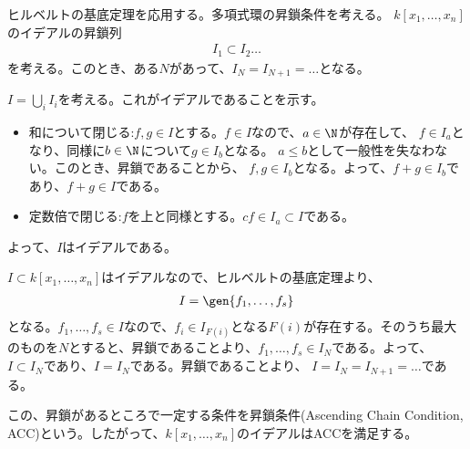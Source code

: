 ヒルベルトの基底定理を応用する。多項式環の昇鎖条件を考える。
$k[x_1,\dots,x_n]$のイデアルの昇鎖列
\begin{align}
  I_1 \subset I_2 \dots
\end{align}
を考える。このとき、ある$N$があって、$I_N = I_{N+1}=\dots$となる。
\begin{myproof}
  $I=\bigcup_{i} I_i$を考える。これがイデアルであることを示す。
  \begin{itemize}
    \item 和について閉じる:$f,g\in I$とする。$f\in I$なので、$a\in \N$が存在して、
    $f \in I_a$となり、同様に$b\in \N$について$g\in I_b$となる。
    $a\le b$として一般性を失なわない。このとき、昇鎖であることから、
    $f,g\in I_b$となる。よって、$f+g \in I_b$であり、$f+g \in I$である。
    \item 定数倍で閉じる:$f$を上と同様とする。$cf \in I_a \subset I$である。
  \end{itemize}
  よって、$I$はイデアルである。

  $I\subset k[x_1,\dots,x_n]$はイデアルなので、ヒルベルトの基底定理より、
  \begin{align}
    I = \gen{f_1,\dots,f_s}
  \end{align}
  となる。$f_1,\dots,f_s \in I$なので、$f_i \in I_{F(i)}$となる$F(i)$が存在する。そのうち最大のものを$N$とすると、昇鎖であることより、$f_1,\dots,f_s \in I_{N}$である。よって、$I\subset I_N$であり、$I = I_N$である。昇鎖であることより、
  $I=I_N = I_{N+1}=\dots$である。
\end{myproof}

この、昇鎖があるところで一定する条件を昇鎖条件(Ascending Chain Condition, ACC)という。したがって、$k[x_1,\dots,x_n]$のイデアルはACCを満足する。

